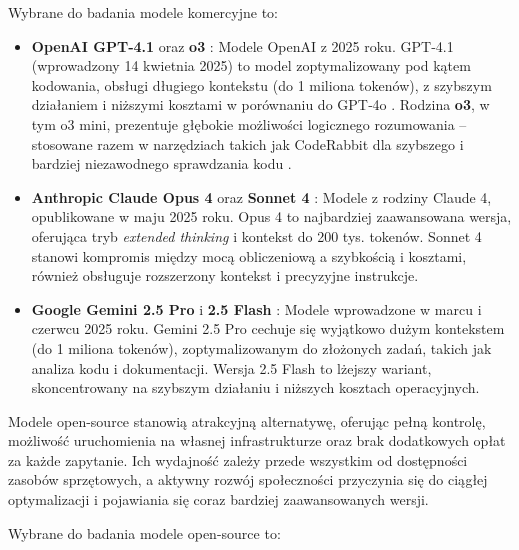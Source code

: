 Wybrane do badania modele komercyjne to:

\begin{itemize}
    \item \textbf{OpenAI GPT‑4.1} \cite{gpt41} oraz \textbf{o3} \cite{o3}: Modele OpenAI z 2025 roku. GPT‑4.1 (wprowadzony 14 kwietnia 2025) to model zoptymalizowany pod kątem kodowania, obsługi długiego kontekstu (do 1 miliona tokenów), z szybszym działaniem i niższymi kosztami w porównaniu do GPT‑4o . Rodzina \textbf{o3}, w tym o3 mini, prezentuje głębokie możliwości logicznego rozumowania – stosowane razem w narzędziach takich jak CodeRabbit dla szybszego i bardziej niezawodnego sprawdzania kodu \cite{coderabbit}.
    
    \item \textbf{Anthropic Claude Opus 4} \cite{claude_opus4} oraz \textbf{Sonnet 4} \cite{claude_sonnet4}: Modele z rodziny Claude 4, opublikowane w maju 2025 roku. Opus 4 to najbardziej zaawansowana wersja, oferująca tryb \textit{extended thinking} i kontekst do 200 tys. tokenów. Sonnet 4 stanowi kompromis między mocą obliczeniową a szybkością i kosztami, również obsługuje rozszerzony kontekst i precyzyjne instrukcje.

    \item \textbf{Google Gemini 2.5 Pro} \cite{gemini25_pro} i \textbf{2.5 Flash} \cite{gemini25_flash}: Modele wprowadzone w marcu i czerwcu 2025 roku. Gemini 2.5 Pro cechuje się wyjątkowo dużym kontekstem (do 1 miliona tokenów), zoptymalizowanym do złożonych zadań, takich jak analiza kodu i dokumentacji. Wersja 2.5 Flash to lżejszy wariant, skoncentrowany na szybszym działaniu i niższych kosztach operacyjnych.
\end{itemize}

Modele open-source stanowią atrakcyjną alternatywę, oferując pełną kontrolę, możliwość uruchomienia na własnej infrastrukturze oraz brak dodatkowych opłat za każde zapytanie. Ich wydajność zależy przede wszystkim od dostępności zasobów sprzętowych, a aktywny rozwój społeczności przyczynia się do ciągłej optymalizacji i pojawiania się coraz bardziej zaawansowanych wersji.

Wybrane do badania modele open-source to:

